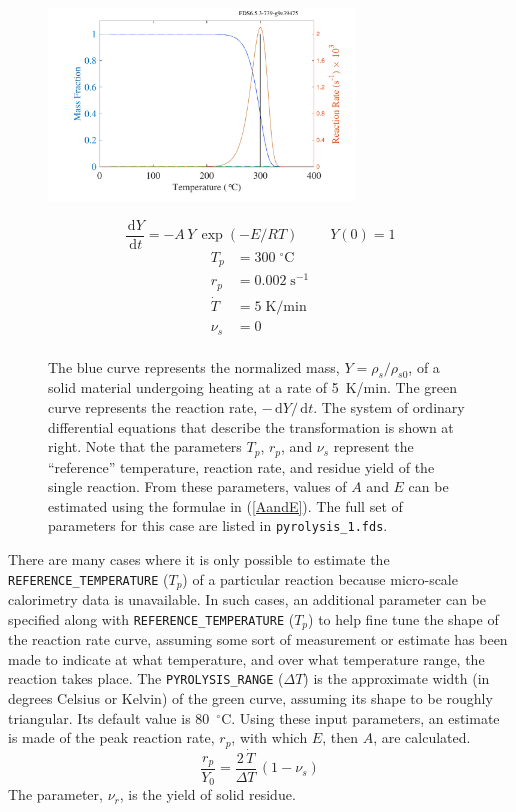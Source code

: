 \documentclass[11pt]{book}
\newcommand{\ct}{\tt\small}
\renewcommand{\d}{\,\mathrm{d}}
\newcommand{\be}{\begin{equation}}
\newcommand{\ee}{\end{equation}}
\begin{document}
\begin{figure}[ht]
\noindent
\begin{minipage}{0.5\textwidth}
\includegraphics[width=3.2in]{SCRIPT_FIGURES/pyrolysis_1}
\end{minipage}
\hfill
\begin{minipage}{0.5\textwidth}
\begin{equation*}
   \frac{\d Y}{\d t} = -A \, Y \, \exp(-E/RT)   \quad \; \quad    Y(0) =1
\end{equation*}
\begin{align*}
   T_p &= 300 \; ^\circ\mathrm{C}  \\
   r_p &= 0.002   \; \mathrm{s}^{-1}  \\
   \dot{T} &= 5 \; \mathrm{K/min} \\
   \nu_s &= 0 \\
\end{align*}
\end{minipage}
\caption[Simple demonstration of the pyrolysis model]{The blue curve represents the normalized mass, $Y=\rho_s/\rho_{s0}$, of a solid material
undergoing heating at a rate of 5~K/min. The green curve represents the reaction rate, $-\d Y/\d t$. The system of ordinary differential equations that describe the transformation is shown at right. Note that the parameters $T_p$, $r_p$, and $\nu_s$ represent the ``reference'' temperature,
reaction rate, and residue yield of the single reaction. From these parameters, values of $A$ and $E$ can be estimated using
the formulae in (\ref{AandE}). The full set of parameters for this case are listed in {\ct pyrolysis\_1.fds}.}
\label{pyrolysis}
\end{figure} \normalsize

There are many cases where it is only possible to estimate the {\ct REFERENCE\_TEMPERATURE} ($T_p$) of a particular
reaction because micro-scale calorimetry data is unavailable. In such cases,
an additional parameter can be specified along with {\ct REFERENCE\_TEMPERATURE} ($T_p$) to help fine tune the shape of the
reaction rate curve, assuming some sort of measurement or estimate has been made to indicate at what temperature, and over what
temperature range, the
reaction takes place. The {\ct PYROLYSIS\_RANGE} ($\Delta T$) is the
approximate width (in degrees Celsius or Kelvin) of the green curve, assuming its shape to be roughly triangular. Its default value is
80~$^\circ$C. Using these input parameters, an estimate is made of the peak reaction rate, $r_p$, with which $E$, then $A$,
are calculated.
\be
   \frac{r_p}{Y_0} = \frac{2 \, \dot{T}} {\Delta T} \, (1-\nu_s) \label{r_p}
\ee
The parameter, $\nu_r$, is the yield of solid residue.
\end{document}
